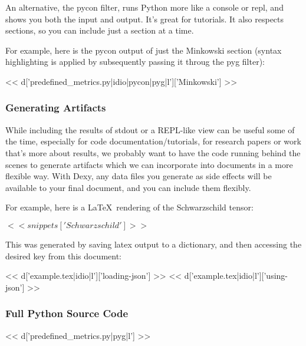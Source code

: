 \documentclass[%
 reprint,
 amsmath,amssymb,
 aps,
]{revtex4-1}
\begin{document}
An alternative, the pycon filter, runs Python more like a console or repl, and
shows you both the input and output. It's great for tutorials. It also respects
sections, so you can include just a section at a time.

For example, here is the pycon output of just the Minkowski section (syntax
highlighting is applied by subsequently passing it throug the pyg filter):

<< d['predefined_metrics.py|idio|pycon|pyg|l']['Minkowski'] >>

\subsubsection{\label{sec:level3}Generating Artifacts}

While including the results of stdout or a REPL-like view can be useful some of
the time, especially for code documentation/tutorials, for research papers or
work that's more about results, we probably want to have the code running
behind the scenes to generate artifacts which we can incorporate into documents
in a more flexible way. With Dexy, any data files you generate as side effects will be available to your final document, and you can include them flexibly.

For example, here is a \LaTeX\ rendering of the Schwarzschild tensor:

\vspace{5mm}

$<< snippets['Schwarzschild'] >>$

\vspace{5mm}

This was generated by saving latex output to a dictionary, and then accessing the desired key from this document:

<< d['example.tex|idio|l']['loading-json'] >>
<< d['example.tex|idio|l']['using-json'] >>


\subsubsection{\label{sec:level3}Full Python Source Code}

\begin{widetext}
<< d['predefined_metrics.py|pyg|l'] >>
\end{widetext}
\end{document}
